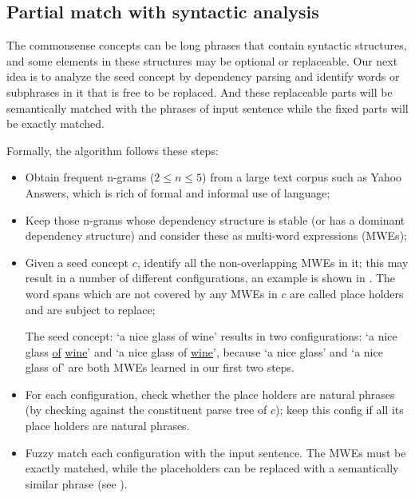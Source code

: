 


\subsection{Partial match with syntactic analysis}
The commonsense concepts can be long phrases that contain
syntactic structures, and some elements in these structures may be
optional or replaceable. Our next idea is to analyze the seed concept
by dependency parsing and identify words or subphrases in it that is free 
to be replaced. And these replaceable parts will be semantically matched
with the phrases of input sentence while the fixed parts will be exactly matched.

Formally, the algorithm follows these steps:
\begin{itemize}
\item Obtain frequent n-grams ($2 \leq n \leq 5$) from a large text
corpus such as Yahoo Answers, which is rich of formal and informal
use of language; 
\item Keep those n-grams whose dependency structure is stable (or
has a dominant dependency structure) and consider these as multi-word expressions (MWEs);
\item Given a seed concept $c$, identify all the non-overlapping MWEs in it;
this may result in a number of different configurations, an example is shown in . 
The word spans which are not covered by any MWEs in $c$ are called place
holders and are subject to replace;
\begin{example}\label{pattern}

The seed concept: `a nice glass of wine' results in two configurations: `a nice glass \uline{of} \uline{wine}' and `a nice glass of \uline{wine}', because `a nice glass' and `a nice glass of' are both MWEs learned in our first two steps.

\end{example}
\item For each configuration, check whether the place holders are 
natural phrases (by checking against the constituent parse tree of $c$); 
keep this config if all its place holders are natural phrases.
\item Fuzzy match each configuration with the input sentence. The MWEs must be exactly matched, while the placeholders can be replaced with a semantically
similar phrase (see ).
\end{itemize}


